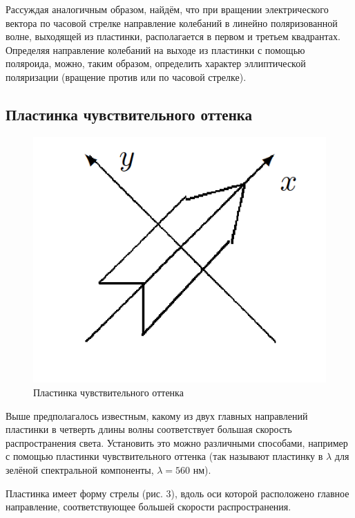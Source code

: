 \documentclass[a4paper, 12pt]{article}%
\begin{document}
	Рассуждая аналогичным образом, найдём, что при вращении электрического вектора по часовой стрелке направление колебаний в линейно поляризованной волне, выходящей из пластинки, располагается в первом и третьем квадрантах. Определяя направление колебаний на выходе из пластинки с помощью поляроида, можно, таким образом, определить характер эллиптической поляризации (вращение против или по часовой стрелке).
	
	\subsection{Пластинка чувствительного оттенка}
	
	\begin{figure}
		\includegraphics[width=\linewidth]{3}
		\caption{Пластинка
			чувствительного
			оттенка}
		\label{ris 3}
	\end{figure}
	
	Выше предполагалось известным, какому из двух главных направлений пластинки в четверть длины волны соответствует большая скорость распространения света.
	Установить это можно различными способами, например с помощью
	пластинки чувствительного оттенка (так называют пластинку в $ \lambda $
	для зелёной спектральной компоненты, $ \lambda = 560 $ нм).
	
	Пластинка имеет форму стрелы (рис. 3), вдоль оси которой расположено главное направление, соответствующее большей скорости распространения.
	
\end{document}
